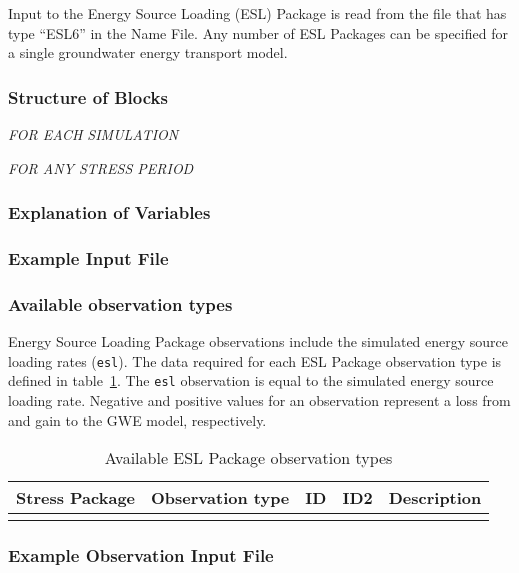 Input to the Energy Source Loading (ESL) Package is read from the file that has type ``ESL6'' in the Name File.  Any number of ESL Packages can be specified for a single groundwater energy transport model.

\vspace{5mm}
\subsubsection{Structure of Blocks}
\vspace{5mm}

\noindent \textit{FOR EACH SIMULATION}


\vspace{5mm}
\noindent \textit{FOR ANY STRESS PERIOD}

\gwepackageperioddescription

\vspace{5mm}
\subsubsection{Explanation of Variables}
\begin{description}

\end{description}

\vspace{5mm}
\subsubsection{Example Input File}


\vspace{5mm}
\subsubsection{Available observation types}
Energy Source Loading Package observations include the simulated energy source loading rates (\texttt{esl}). The data required for each ESL Package observation type is defined in table~\ref{table:gwe-eslobstype}. The \texttt{esl} observation is equal to the simulated energy source loading rate. Negative and positive values for an observation represent a loss from and gain to the GWE model, respectively.

\begin{longtable}{p{2cm} p{2.75cm} p{2cm} p{1.25cm} p{7cm}}
\caption{Available ESL Package observation types} \tabularnewline

\hline
\hline
\textbf{Stress Package} & \textbf{Observation type} & \textbf{ID} & \textbf{ID2} & \textbf{Description} \\
\hline
\endhead

\hline
\endfoot


\label{table:gwe-eslobstype}
\end{longtable}

\vspace{5mm}
\subsubsection{Example Observation Input File}


